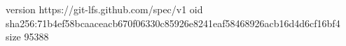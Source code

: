 version https://git-lfs.github.com/spec/v1
oid sha256:71b4ef58bcaaceacb670f06330c85926e8241eaf58468926acb16d4d6cf16bf4
size 95388
